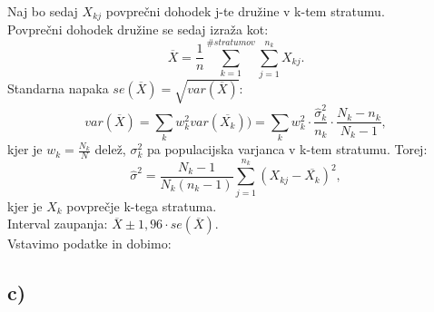 \documentclass{article}
\begin{document}
Naj bo sedaj $X_{kj}$ povprečni dohodek j-te družine v k-tem stratumu.\\
Povprečni dohodek družine se sedaj izraža kot:
\begin{equation}
\overline{X} = \frac{1}{n} \sum_{k=1}^{\# stratumov} \sum_{j=1}^{n_k} X_{kj}.
\end{equation}
Standarna napaka $se(\overline{X}) = \sqrt{var( \overline{X})}$:
\begin{equation}
var(\overline{X}) = \sum_k w_k^2 var(\overline{X_k}))  = \sum_k w_k^2 \cdot \frac{\hat{\sigma}_k^2}{n_k} \cdot \frac{N_k-n_k}{N_k-1},
\end{equation}
kjer je $w_k = \frac{N_k}{N}$ delež, $\sigma_k^2$ pa populacijska varjanca v k-tem stratumu. Torej:
\begin{equation}
\hat{\sigma}^2 = \frac{N_k-1}{N_k(n_k-1)} \sum_{j=1}^{n_k} (X_{kj}-\overline{X_k})^2,
\end{equation}
kjer je $X_k$ povprečje k-tega stratuma.\\
Interval zaupanja: $\overline{X} \pm 1,96 \cdot se(\overline{X})$. \\
Vstavimo podatke in dobimo:


\subsection*{c)}
\end{document}
